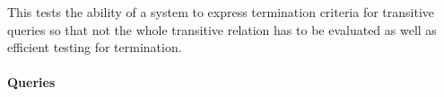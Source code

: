 
This tests the ability of a system to express termination criteria for
transitive queries so that not the whole transitive relation has to be evaluated
as well as efficient testing for termination.


\paragraph{Queries}
{\raggedright
}